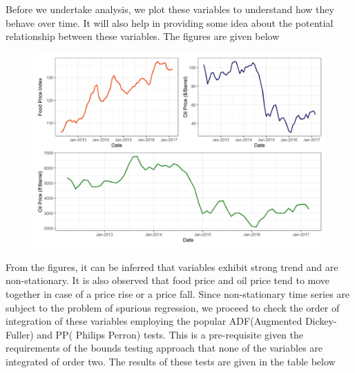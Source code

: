 \documentclass[a4paper,12pt]{article}
\begin{document}
Before we undertake analysis, we plot these variables to understand how they behave over time. It will also help in providing some idea about the potential relationship between these variables. The figures are given below
\begin{figure}
\centering
\includegraphics[scale=0.5]{new_trend.jpg}
\end{figure}

From the figures, it can be inferred that variables exhibit strong trend and are non-stationary. It is also observed that food price and oil price tend to move together in case of a price rise or a price fall. Since non-stationary time series are subject to the problem of spurious regression, we proceed to check the order of integration of these variables employing the popular ADF(Augmented Dickey-Fuller) and PP( Philips Perron) tests. This is a pre-requisite given the requirements of the bounds testing approach that none of the variables are integrated of order two. The results of these tests are given in the table below
\end{document}
